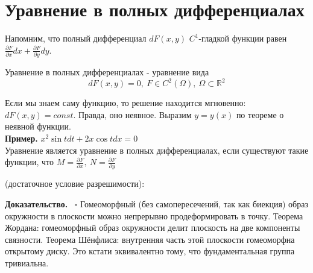 \section{Уравнение в полных дифференциалах}
Напомним, что полный дифференциал $dF(x,y)$  $C^1$-гладкой функции
равен  $\frac{\partial F}{\partial x} dx+\frac{\partial F}{\partial y}dy$.
\begin{defin}
Уравнение в полных дифференциалах - уравнение вида
$$dF(x,y)=0,~F\in C^2(\Omega),~\Omega\subset \mathbb{R}^2$$
\end{defin}
Если мы знаем саму функцию, то решение находится мгновенно: $dF(x,y)=const$.
Правда, оно неявное. Выразим  $y=y(x)$ по теореме о неявной функции.\\
\textbf{Пример.} $x^2\sin{t}dt+2x\cos{t}dx=0$\\
Уравнение является уравнение в полных дифференциалах, если существуют такие
функции, что $M=\frac{\partial F}{\partial x},~N=\frac{\partial F}{\partial y}$

\begin{theor}
    (достаточное условие разрешимости):

\end{theor}
\textbf{Доказательство.}  \
$\square$ 
Гомеоморфный (без самопересечений, так как биекция) образ окружности в
плоскости можно непрерывно продеформировать в точку. Теорема Жордана: 
гомеоморфный образ окружности делит плоскость на две компоненты связности. 
Теорема Шёнфлиса: внутренняя часть этой плоскости гомеоморфна открытому 
диску. Это кстати эквивалентно тому, что фундаментальная группа 
тривиальна. 
